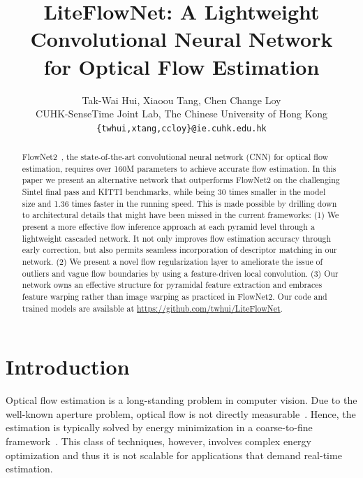 \documentclass[10pt,twocolumn,letterpaper]{article}
\begin{document}
\title{LiteFlowNet: A Lightweight Convolutional Neural Network \\for Optical Flow Estimation}

\author{Tak-Wai Hui, Xiaoou Tang, Chen Change Loy\\
CUHK-SenseTime Joint Lab, The Chinese University of Hong Kong\\
{\tt\small \{twhui,xtang,ccloy\}@ie.cuhk.edu.hk}}

\maketitle


\begin{abstract}
FlowNet2~\cite{Ilg17}, the state-of-the-art convolutional neural network (CNN) for optical flow estimation, requires over 160M parameters to achieve accurate flow estimation. In this paper we present an alternative network that outperforms FlowNet2 on the challenging Sintel final pass and KITTI benchmarks, while being 30 times smaller in the model size and 1.36 times faster in the running speed. This is made possible by drilling down to architectural details that might have been missed in the current frameworks: (1) We present a more effective flow inference approach at each pyramid level through a lightweight cascaded network. It not only improves flow estimation accuracy through early correction, but also permits seamless incorporation of descriptor matching in our network. (2) We present a novel flow regularization layer to ameliorate the issue of outliers and vague flow boundaries by using a feature-driven local convolution. (3) Our network owns an effective structure for pyramidal feature extraction and embraces feature warping rather than image warping as practiced in FlowNet2. Our code and trained models are available at \url{https://github.com/twhui/LiteFlowNet}.
\end{abstract}

\section{Introduction}
\label{sec:introduction}
%
Optical flow estimation is a long-standing problem in computer vision. Due to the well-known aperture problem, optical flow is not directly measurable~\cite{Horn81, Hui13}. Hence, the estimation is typically solved by energy minimization in a coarse-to-fine framework~\cite{Brox04, Papenberg06, Brox11, Zimmer11, Sun14, Revaud15}. 
%
This class of techniques, however, involves complex energy optimization and thus it is not scalable for applications that demand real-time estimation.
\end{document}
